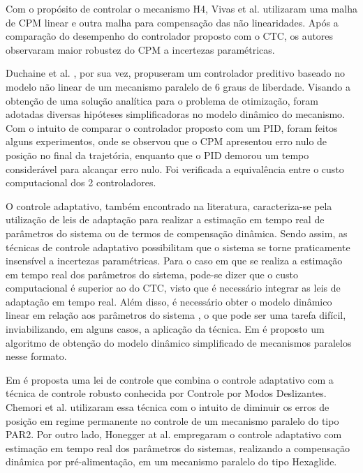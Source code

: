 \documentclass[]{politex}
\begin{document}
Com o propósito de controlar o mecanismo H4, Vivas et al. \cite{Vivas} utilizaram  uma malha de CPM linear e outra malha para compensação das não linearidades. Após a comparação do desempenho do controlador proposto com  o CTC, os autores observaram maior robustez do CPM a incertezas paramétricas. 

Duchaine et al. \cite{Duchaine}, por sua vez, propuseram um controlador preditivo baseado no modelo não linear de um mecanismo paralelo de 6 graus de liberdade. Visando a obtenção de uma solução analítica para o problema de otimização, foram adotadas diversas hipóteses simplificadoras no modelo dinâmico do mecanismo. Com o intuito de comparar o controlador proposto com um PID, foram feitos alguns experimentos, onde se observou  que o CPM apresentou erro nulo de posição no final da trajetória, enquanto que o PID demorou um tempo considerável para alcançar erro nulo. Foi verificada a equivalência entre o custo computacional dos 2 controladores. 

O controle adaptativo, também encontrado na literatura, caracteriza-se pela utilização de leis de adaptação para realizar a estimação em tempo real de parâmetros do sistema ou de termos de compensação dinâmica. Sendo assim, as técnicas de controle adaptativo possibilitam que o sistema se torne praticamente insensível a incertezas paramétricas. Para o caso em que se realiza a estimação em tempo real dos parâmetros do sistema, pode-se dizer que o custo computacional é superior ao do CTC, visto que é necessário integrar as leis de adaptação em tempo real. Além disso, é necessário obter o modelo dinâmico linear em relação aos parâmetros do sistema \cite{SlotiniA}, o que pode ser uma tarefa difícil, inviabilizando, em alguns casos, a aplicação da técnica. Em \cite{Codourey2} é proposto um algoritmo de obtenção do modelo dinâmico simplificado de mecanismos paralelos nesse formato.

Em \cite{SlotiniA} é proposta uma lei de controle que combina o controle adaptativo com a técnica de controle robusto conhecida por Controle por Modos Deslizantes. Chemori et al. \cite{Chemori} utilizaram essa técnica  com o intuito de diminuir os erros de posição em regime permanente no controle de um mecanismo paralelo do tipo PAR2. Por outro lado, Honegger at al. \cite{Honegger} empregaram o controle adaptativo com estimação em tempo real dos parâmetros do sistemas, realizando a compensação dinâmica por pré-alimentação, em um mecanismo  paralelo do tipo Hexaglide.
\end{document}
